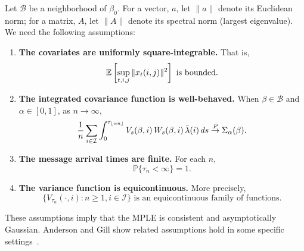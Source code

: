 \documentclass[aoas,preprint]{imsart}
\begin{document}
Let $\mathcal{B}$ be a neighborhood of $\beta_0$.  For a vector, $a$, let
$\| a \|$ denote its Euclidean norm; for a matrix, $A$, let $\| A \|$ denote
its spectral norm (largest eigenvalue).  We need the following assumptions:
\begin{enumerate}[{A}1.]
    \item \label{A:square-int}
    \textbf{The covariates are uniformly square-integrable.}  That is,
    \[
        \mathbb{E}\left[
            \sup_{t, i, j} \| x_{t}(i,j) \|^2
        \right]
        \,\,\text{is bounded.}
    \]

    \item \label{A:integrated-cov-limit}
    \textbf{The integrated covariance function is well-behaved.}
    When $\beta \in \mathcal{B}$ and $\alpha \in [0,1]$, as $ n \to \infty$,
    \[
        \frac{1}{n}
        \sum_{i \in \mathcal{I}}
        \int_0^{\tau_{\lfloor \alpha n \rfloor}}
            V_s(\beta,i)
            \, W_s(\beta,i)
            \, \bar \lambda(i)
            \, ds
        \overset{\mathit{P}}{\to}
        \Sigma_\alpha(\beta).
    \]

    \item \label{A:message-times-finite}
    \textbf{The message arrival times are finite.}  For each $n$,
    \[
        \mathbb{P}\{\tau_n < \infty\} = 1.
    \]
    
    \item \label{A:var-equicont}
    \textbf{The variance function is equicontinuous.}
    More precisely,
    \[
        \Big\{
            V_{\tau_n}(\cdot, i)
            :
            n \geq 1, i \in \mathcal{I}
        \Big\}
        \,\,\text{is an equicontinuous family of functions.}
    \]
\end{enumerate}
These assumptions imply that the MPLE is consistent and asymptotically
Gaussian.  Anderson and Gill show related assumptions hold in some
specific settings~\cite{andersen1982cox}.
\end{document}
